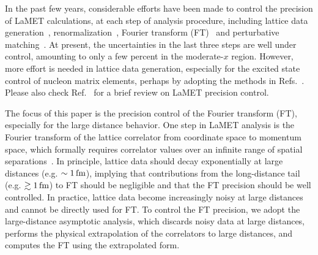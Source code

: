 \documentclass[a4paper,11pt]{article}
\begin{document}
In the past few years, considerable efforts have been made to control the precision of LaMET calculations, at each step of analysis procedure, including lattice data generation~\cite{Bali:2016lva,Gao:2023lny,Zhao:2023ptv,Bhattacharya:2023jsc,Zhang:2025hyo}, renormalization~\cite{Ji:2017oey,Ishikawa:2017faj,Green:2017xeu,Constantinou:2017sej,Stewart:2017tvs,Alexandrou:2017huk,Chen:2017mzz,Ji:2020brr,LatticePartonLPC:2021gpi,Zhang:2023bxs,Alexandrou:2023ucc,Spanoudes:2024kpb}, Fourier transform (FT)~\cite{Ji:2020brr,Gao:2021dbh,Chen:2025cxr,Xiong:2025obq,Ling:2025olz} and perturbative matching~\cite{Li:2020xml,Chen:2020ody,Ji:2025mvk,Su:2022fiu,Holligan:2023rex,Zhang:2023bxs,Gao:2021hxl,Ji:2023pba,Liu:2023onm,Ji:2024hit,Cloet:2024vbv,Holligan:2025baj}. At present, the uncertainties in the last three steps are well under control, amounting to only a few percent in the moderate-$x$ region. However, more effort is needed in lattice data generation, especially for the excited state control of nucleon matrix elements, perhaps by adopting the methods in Refs.~\cite{Blossier:2009kd,Barca:2025det,Wang:2025nsd,Abbott:2025yhm,Lyu:2025lnd}. Please also check Ref.~\cite{Zhao:2025oto} for a brief review on LaMET precision control. 

The focus of this paper is the precision control of the Fourier transform (FT), especially for the large distance behavior. One step in LaMET analysis is the Fourier transform of the lattice correlator from coordinate space to momentum space, which formally requires correlator values over an infinite range of spatial separations~\cite{Ji:2020brr}. In principle, lattice data should decay exponentially at large distances (e.g. $\sim 1 \, {\rm fm}$), implying that contributions from the long-distance tail (e.g. $ \gtrsim 1 \, {\rm fm}$) to FT should be negligible and that the FT precision should be well controlled. In practice, lattice data become increasingly noisy at large distances and cannot be directly used for FT. To control the FT precision, we adopt the large-distance asymptotic analysis, which discards noisy data at large distances, performs the physical extrapolation of the correlators to large distances, and computes the FT using the extrapolated form. 
\end{document}
